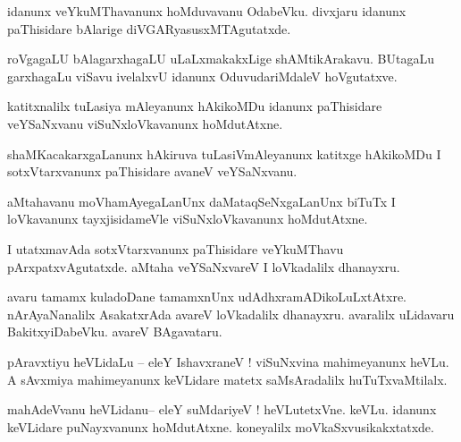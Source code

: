 \documentclass{article}
\begin{document}
\begin{mn}%
idanunx veYkuMThavanunx hoMduvavanu OdabeVku. divxjaru idanunx paThisidare bAlarige 
diVGARyasusxMTAgutatxde.
\end{mn}

\begin{mn}%
roVgagaLU bAlagarxhagaLU uLaLxmakakxLige shAMtikArakavu. BUtagaLu garxhagaLu viSavu ivelalxvU 
idanunx OduvudariMdaleV hoVgutatxve.
\end{mn}

\begin{mn}%
katitxnalilx tuLasiya mAleyanunx hAkikoMDu idanunx paThisidare veYSaNxvanu viSuNxloVkavanunx 
hoMdutAtxne.
\end{mn}

\begin{mn}%
shaMKacakarxgaLanunx hAkiruva tuLasiVmAleyanunx katitxge hAkikoMDu I sotxVtarxvanunx paThisidare 
avaneV veYSaNxvanu.
\end{mn}

\begin{mn}%
aMtahavanu moVhamAyegaLanUnx daMataqSeNxgaLanUnx biTuTx I loVkavanunx tayxjisidameVle 
viSuNxloVkavanunx hoMdutAtxne.
\end{mn}

\begin{mn}%
I utatxmavAda sotxVtarxvanunx paThisidare veYkuMThavu pArxpatxvAgutatxde. aMtaha veYSaNxvareV I 
loVkadalilx dhanayxru.
\end{mn}

\begin{mn}%
avaru tamamx kuladoDane tamamxnUnx udAdhxramADikoLuLxtAtxre. nArAyaNanalilx AsakatxrAda avareV 
loVkadalilx dhanayxru. avaralilx uLidavaru BakitxyiDabeVku. avareV BAgavataru.
\end{mn}


\begin{mn}%
pAravxtiyu heVLidaLu -- eleY IshavxraneV ! viSuNxvina mahimeyanunx heVLu. A sAvxmiya mahimeyanunx 
keVLidare matetx saMsAradalilx huTuTxvaMtilalx.
\end{mn}

\begin{mn}%
mahAdeVvanu heVLidanu-- eleY suMdariyeV ! heVLutetxVne. keVLu. idanunx keVLidare puNayxvanunx 
hoMdutAtxne. koneyalilx moVkaSxvusikakxtatxde.
\end{mn}
\end{document}
